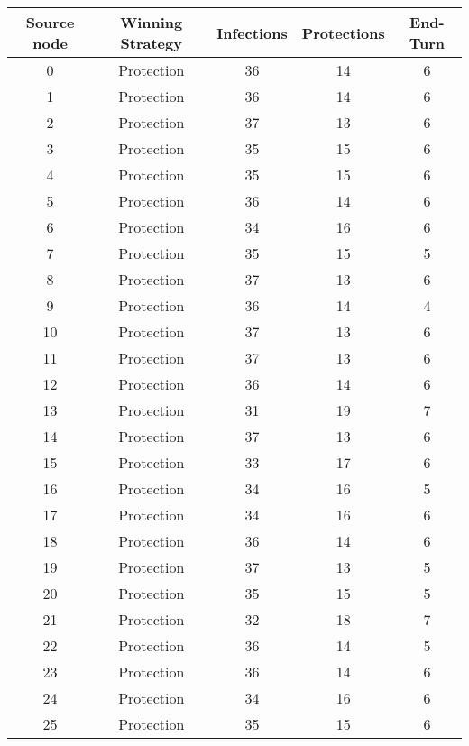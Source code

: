 \documentclass[results.tex]{subfiles}
\begin{document}
\begin{center}
  \begin{tabular}{| c || c | c | c | c |}
    \hline
    {\bfseries Source node} & {\bfseries Winning Strategy} & {\bfseries Infections} & {\bfseries Protections} & {\bfseries End-Turn} \\  %
    \hline\hline
    0 & Protection & 36 & 14 & 6 \\ 
    \hline
    1 & Protection & 36 & 14 & 6 \\ 
    \hline
    2 & Protection & 37 & 13 & 6 \\ 
    \hline
    3 & Protection & 35 & 15 & 6 \\ 
    \hline
    4 & Protection & 35 & 15 & 6 \\ 
    \hline
    5 & Protection & 36 & 14 & 6 \\ 
    \hline
    6 & Protection & 34 & 16 & 6 \\ 
    \hline
    7 & Protection & 35 & 15 & 5 \\ 
    \hline
    8 & Protection & 37 & 13 & 6 \\ 
    \hline
    9 & Protection & 36 & 14 & 4 \\ 
    \hline
    10 & Protection & 37 & 13 & 6 \\ 
    \hline
    11 & Protection & 37 & 13 & 6 \\ 
    \hline
    12 & Protection & 36 & 14 & 6 \\ 
    \hline
    13 & Protection & 31 & 19 & 7 \\ 
    \hline
    14 & Protection & 37 & 13 & 6 \\ 
    \hline
    15 & Protection & 33 & 17 & 6 \\ 
    \hline
    16 & Protection & 34 & 16 & 5 \\ 
    \hline
    17 & Protection & 34 & 16 & 6 \\ 
    \hline
    18 & Protection & 36 & 14 & 6 \\ 
    \hline
    19 & Protection & 37 & 13 & 5 \\ 
    \hline
    20 & Protection & 35 & 15 & 5 \\ 
    \hline
    21 & Protection & 32 & 18 & 7 \\ 
    \hline
    22 & Protection & 36 & 14 & 5 \\ 
    \hline
    23 & Protection & 36 & 14 & 6 \\ 
    \hline
    24 & Protection & 34 & 16 & 6 \\ 
    \hline
    25 & Protection & 35 & 15 & 6 \\ 

\end{tabular}
\end{center}
\end{document}
